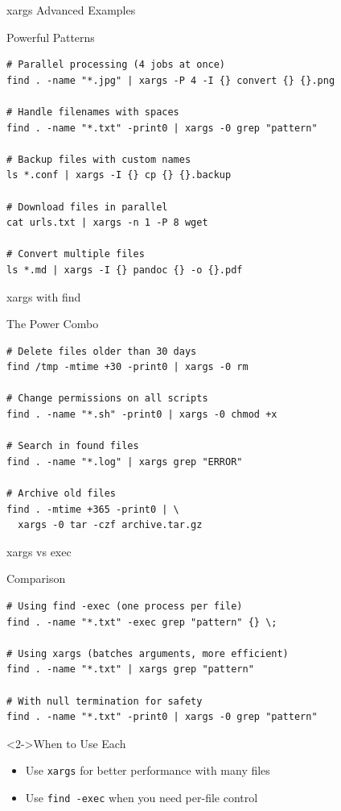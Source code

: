 \documentclass[presentation,aspectratio=1610]{beamer}
\begin{document}
\begin{frame}[label={sec:orgf130ef7},fragile]{xargs Advanced Examples}
 \begin{block}{Powerful Patterns}
\begin{verbatim}
# Parallel processing (4 jobs at once)
find . -name "*.jpg" | xargs -P 4 -I {} convert {} {}.png

# Handle filenames with spaces
find . -name "*.txt" -print0 | xargs -0 grep "pattern"

# Backup files with custom names
ls *.conf | xargs -I {} cp {} {}.backup

# Download files in parallel
cat urls.txt | xargs -n 1 -P 8 wget

# Convert multiple files
ls *.md | xargs -I {} pandoc {} -o {}.pdf
\end{verbatim}
\end{block}
\end{frame}
\begin{frame}[label={sec:org70c7253},fragile]{xargs with find}
 \begin{block}{The Power Combo}
\begin{verbatim}
# Delete files older than 30 days
find /tmp -mtime +30 -print0 | xargs -0 rm

# Change permissions on all scripts
find . -name "*.sh" -print0 | xargs -0 chmod +x

# Search in found files
find . -name "*.log" | xargs grep "ERROR"

# Archive old files
find . -mtime +365 -print0 | \
  xargs -0 tar -czf archive.tar.gz
\end{verbatim}
\end{block}
\end{frame}
\begin{frame}[label={sec:org8a765a3},fragile]{xargs vs exec}
 \begin{block}{Comparison}
\begin{verbatim}
# Using find -exec (one process per file)
find . -name "*.txt" -exec grep "pattern" {} \;

# Using xargs (batches arguments, more efficient)
find . -name "*.txt" | xargs grep "pattern"

# With null termination for safety
find . -name "*.txt" -print0 | xargs -0 grep "pattern"
\end{verbatim}
\end{block}
\begin{exampleblock}<2->{When to Use Each}\label{sec:org0e38cd5}
\begin{itemize}
\item Use \texttt{xargs} for better performance with many files
\item Use \texttt{find -exec} when you need per-file control
\end{itemize}
\end{exampleblock}
\end{frame}
\end{document}
